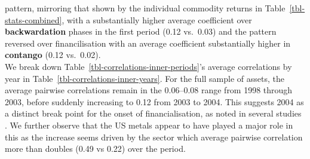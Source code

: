 \documentclass[
  authoryear,
  preprint,
  3p]{elsarticle}
\begin{document}
pattern, mirroring that shown by the individual commodity returns in
Table~\ref{tbl-stats-combined}, with a substantially higher average
coefficient over \textbf{backwardation} phases in the first period (0.12
vs.~0.03) and the pattern reversed over financilisation with an average
coefficient substantially higher in \textbf{contango} (0.12 vs.~0.02).\\
We break down Table~\ref{tbl-correlations-inner-periods}'s average
correlations by year in Table~\ref{tbl-correlations-inner-years}. For
the full sample of assets, the average pairwise correlations remain in
the 0.06--0.08 range from 1998 through 2003, before suddenly increasing
to 0.12 from 2003 to 2004. This suggests 2004 as a distinct break point
for the onset of financialisation, as noted in several studies
\citep{baker_financialization_2021, tang_index_2012}. We further observe
that the US metals appear to have played a major role in this as the
increase seems driven by the sector which average pairwise correlation
more than doubles (0.49 vs 0.22) over the period.

\medskip
\end{document}
